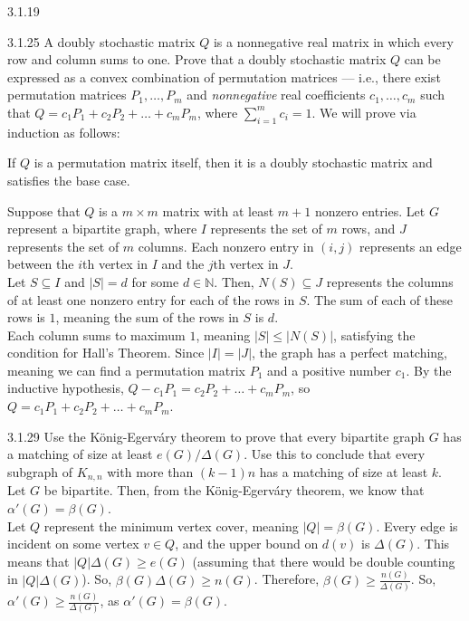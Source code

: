\documentclass[10pt]{extarticle}
\begin{document}
{\begin{problem}{3.1.19}
  \end{problem}
  \begin{problem}{3.1.25}
    A doubly stochastic matrix $Q$ is a nonnegative real matrix in which every row and column sums to one. Prove that a doubly stochastic matrix $Q$ can be expressed as a convex combination of permutation matrices --- i.e., there exist permutation matrices $P_1,\dots,P_m$ and \textit{nonnegative} real coefficients $c_1,\dots,c_m$ such that $Q = c_1P_1 + c_2P_2 + \dots + c_mP_m$, where $\sum_{i = 1}^{m} c_i = 1$.
    \tcblower
    We will prove via induction as follows:
    \begin{description}[font = \normalfont\scshape]
      \item[Base Case] If $Q$ is a permutation matrix itself, then it is a doubly stochastic matrix and satisfies the base case.
      \item[Inductive Step] Suppose that $Q$ is a $m\times m$ matrix with at least $m+1$ nonzero entries. Let $G$ represent a bipartite graph, where $I$ represents the set of $m$ rows, and $J$ represents the set of $m$ columns. Each nonzero entry in $(i,j)$ represents an edge between the $i$th vertex in $I$ and the $j$th vertex in $J$.\\

        Let $S\subseteq I$ and $|S| = d$ for some $d\in \mathbb{N}$. Then, $N(S) \subseteq J$ represents the columns of at least one nonzero entry for each of the rows in $S$. The sum of each of these rows is $1$, meaning the sum of the rows in $S$ is $d$.\\

        Each column sums to maximum $1$, meaning $|S| \leq |N(S)|$, satisfying the condition for Hall's Theorem. Since $|I| = |J|$, the graph has a perfect matching, meaning we can find a permutation matrix $P_1$ and a positive number $c_1$. By the inductive hypothesis, $Q - c_1P_1 = c_2P_2+\dots+c_mP_m$, so $Q = c_1P_1 + c_2P_2 + \dots + c_mP_m$.
    \end{description}
  \end{problem}
  \begin{problem}{3.1.29}
    Use the König-Egerváry theorem to prove that every bipartite graph $G$ has a matching of size at least $e(G)/\Delta(G)$. Use this to conclude that every subgraph of $K_{n,n}$ with more than $(k-1)n$ has a matching of size at least $k$.
    \tcblower
    Let $G$ be bipartite. Then, from the König-Egerváry theorem, we know that $\alpha'(G) = \beta(G)$.\\

    Let $Q$ represent the minimum vertex cover, meaning $|Q| = \beta(G)$. Every edge is incident on some vertex $v\in Q$, and the upper bound on $d(v)$ is $\Delta(G)$. This means that $|Q|\Delta(G) \geq e(G)$ (assuming that there would be double counting in $|Q|\Delta(G)$). So, $\beta(G)\Delta(G) \geq n(G)$. Therefore, $\beta(G) \geq \frac{n(G)}{\Delta(G)}$. So, $\alpha'(G) \geq \frac{n(G)}{\Delta(G)}$, as $\alpha'(G) = \beta(G)$.
  \end{problem}
}
\end{document}
